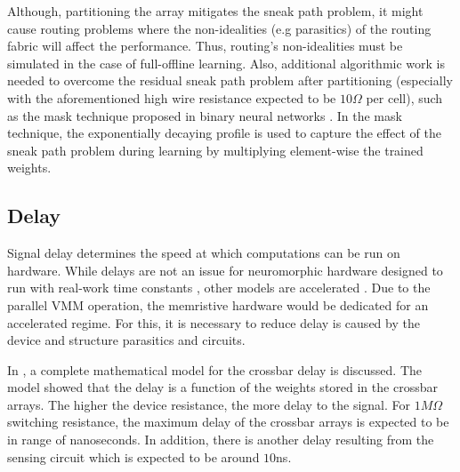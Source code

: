 \documentclass[english]{article}
\renewcommand{\cite}{\citep}
\begin{document}

Although, partitioning the array mitigates the sneak path problem, it might cause routing problems where the non-idealities (e.g parasitics) of the routing fabric will affect the performance. Thus, routing's non-idealities must be simulated in the case of full-offline learning. Also, additional algorithmic work is needed to overcome the residual sneak path problem after partitioning (especially with the aforementioned high wire resistance expected to be $10\Omega$ per cell), such as the mask technique proposed in binary neural networks \cite{fouda2018overcoming}. In the mask technique, the exponentially decaying profile is used to capture the effect of the sneak path problem during learning by multiplying element-wise the trained weights. 

\subsection{Delay}
Signal delay determines the speed at which computations can be run on hardware. While delays are not an issue for neuromorphic hardware designed to run with real-work time constants \cite{Benjamin_etal14_neurmixe,Qiao_etal15_recoon-l}, other models are accelerated \cite{Schemmel_etal08_wafeinte}. Due to the parallel VMM operation, the memristive hardware would be dedicated for an accelerated regime. For this, it is necessary to reduce delay is caused by the device and structure parasitics and circuits.

In \cite{Fouda_etal18_modeanal}, a complete mathematical model for the crossbar delay is discussed. The model showed that the delay is a function of the weights stored in the crossbar arrays. The higher the device resistance, the more delay to the signal. For $1M\Omega$ switching resistance, the maximum delay of the crossbar arrays is expected to be in range of nanoseconds. In addition, there is another delay resulting from the sensing circuit which is expected to be around $10$ns.
\end{document}
